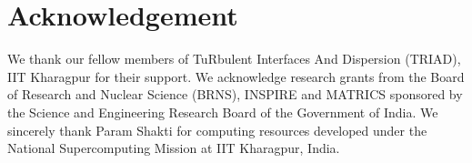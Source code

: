 \documentclass[%
aip,
amsmath,amssymb,
reprint,
]{revtex4-1}
\begin{document}
			\section{Acknowledgement}
			We thank our fellow members of TuRbulent Interfaces And Dispersion (TRIAD), IIT Kharagpur for their support. We acknowledge research grants from the Board of Research and Nuclear Science (BRNS), INSPIRE and MATRICS sponsored by the Science and Engineering Research Board of the Government of India. We sincerely thank Param Shakti for computing resources developed under the National Supercomputing Mission at IIT Kharagpur, India.
			
			
			
			
\end{document}

